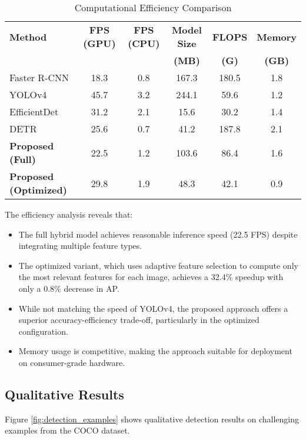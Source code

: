 \begin{table}[h]
\centering
\caption{Computational Efficiency Comparison}
\label{tab:efficiency_results}
\begin{tabular}{lccccc}
\hline
\textbf{Method} & \textbf{FPS (GPU)} & \textbf{FPS (CPU)} & \textbf{Model Size} & \textbf{FLOPS} & \textbf{Memory} \\
 & & & \textbf{(MB)} & \textbf{(G)} & \textbf{(GB)} \\
\hline
Faster R-CNN & 18.3 & 0.8 & 167.3 & 180.5 & 1.8 \\
YOLOv4 & 45.7 & 3.2 & 244.1 & 59.6 & 1.2 \\
EfficientDet & 31.2 & 2.1 & 15.6 & 30.2 & 1.4 \\
DETR & 25.6 & 0.7 & 41.2 & 187.8 & 2.1 \\
\hline
\textbf{Proposed (Full)} & 22.5 & 1.2 & 103.6 & 86.4 & 1.6 \\
\textbf{Proposed (Optimized)} & 29.8 & 1.9 & 48.3 & 42.1 & 0.9 \\
\hline
\end{tabular}
\end{table}

The efficiency analysis reveals that:

\begin{itemize}
    \item The full hybrid model achieves reasonable inference speed (22.5 FPS) despite integrating multiple feature types.
    
    \item The optimized variant, which uses adaptive feature selection to compute only the most relevant features for each image, achieves a 32.4\% speedup with only a 0.8\% decrease in AP.
    
    \item While not matching the speed of YOLOv4, the proposed approach offers a superior accuracy-efficiency trade-off, particularly in the optimized configuration.
    
    \item Memory usage is competitive, making the approach suitable for deployment on consumer-grade hardware.
\end{itemize}

\subsection{Qualitative Results}
Figure \ref{fig:detection_examples} shows qualitative detection results on challenging examples from the COCO dataset.

